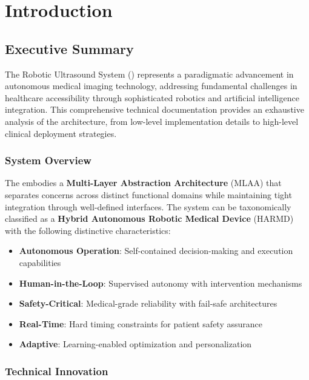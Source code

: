\chapter{Introduction}
\label{ch:introduction}

\section{Executive Summary}
\label{sec:executive_summary}

The Robotic Ultrasound System (\rus{}) represents a paradigmatic advancement in autonomous medical imaging technology, addressing fundamental challenges in healthcare accessibility through sophisticated robotics and artificial intelligence integration. This comprehensive technical documentation provides an exhaustive analysis of the \rus{} architecture, from low-level implementation details to high-level clinical deployment strategies.

\subsection{System Overview}

The \rus{} embodies a \textbf{Multi-Layer Abstraction Architecture} (\textsc{MLAA}) that separates concerns across distinct functional domains while maintaining tight integration through well-defined interfaces. The system can be taxonomically classified as a \textbf{Hybrid Autonomous Robotic Medical Device} (\textsc{HARMD}) with the following distinctive characteristics:

\begin{itemize}[itemsep=0.5em]
    \item \textbf{Autonomous Operation}: Self-contained decision-making and execution capabilities
    \item \textbf{Human-in-the-Loop}: Supervised autonomy with intervention mechanisms
    \item \textbf{Safety-Critical}: Medical-grade reliability with fail-safe architectures
    \item \textbf{Real-Time}: Hard timing constraints for patient safety assurance
    \item \textbf{Adaptive}: Learning-enabled optimization and personalization
\end{itemize}

\subsection{Technical Innovation}

